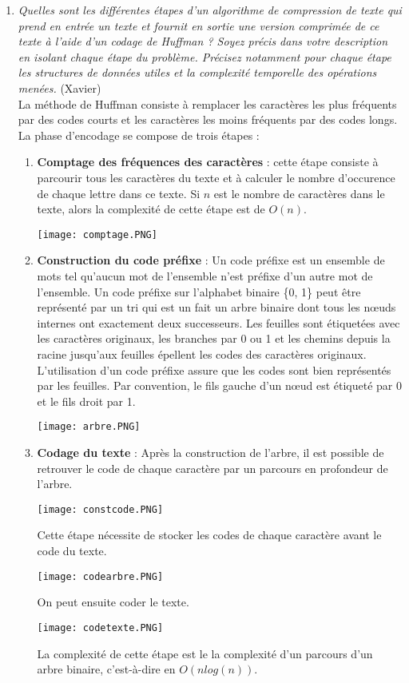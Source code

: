 \documentclass[11pt]{article}
\begin{document}
\begin{enumerate}
\item \textit{Quelles sont les différentes étapes d’un algorithme de compression de texte qui prend en entrée un texte et fournit en sortie une version comprimée de ce texte à
l'aide d'un codage de Huffman ? Soyez précis dans votre description en isolant
chaque étape du problème. Précisez notamment pour chaque étape les structures
de données utiles et la complexité temporelle des opérations menées.} (Xavier) \bigskip \\
La méthode de Huffman consiste à remplacer les caractères les plus fréquents par des codes
courts et les caractères les moins fréquents par des codes longs. La phase d’encodage se compose de trois étapes :
\begin{enumerate}
\item \textbf{Comptage des fréquences des caractères} : cette étape consiste à parcourir tous les caractères du texte et à calculer le nombre d'occurence de chaque lettre dans ce texte. Si $n$ est le nombre de caractères dans le texte, alors la complexité de cette étape est de $O(n)$.
\begin{center}
    \texttt{[image: comptage.PNG]}
\end{center}
\item \textbf{Construction du code préfixe} : Un code préfixe est un ensemble de mots tel qu’aucun mot de
l’ensemble n’est préfixe d’un autre mot de l’ensemble. Un code préfixe sur l’alphabet binaire \{0, 1\} peut être représenté par
un tri qui est un fait un arbre binaire dont tous les nœuds internes ont exactement deux successeurs. Les feuilles sont étiquetées avec les caractères originaux, les branches par 0 ou 1 et les chemins depuis la racine jusqu’aux feuilles épellent les codes des caractères originaux. L’utilisation d’un code préfixe assure que les codes sont bien représentés par les feuilles. Par convention, le fils gauche d’un nœud est étiqueté par 0 et le fils droit
par 1.
\begin{center}
    \texttt{[image: arbre.PNG]}
\end{center}
\item \textbf{Codage du texte} : Après la construction de l’arbre, il est possible de retrouver le code de
chaque caractère par un parcours en profondeur de l’arbre. 
\begin{center}
    \texttt{[image: constcode.PNG]}
\end{center}
Cette étape nécessite de stocker les codes de chaque caractère avant le code du texte.
\begin{center}
    \texttt{[image: codearbre.PNG]}
\end{center}
On peut ensuite coder le texte.
\begin{center}
    \texttt{[image: codetexte.PNG]}
\end{center}
La complexité de cette étape est le la complexité d'un parcours d'un arbre binaire, c'est-à-dire en $O(n log(n))$.\\
\end{enumerate}
\bigskip



\end{enumerate}
\end{document}
